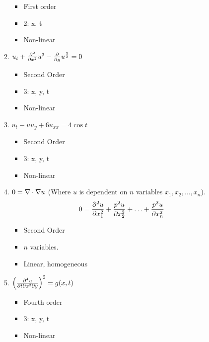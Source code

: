 \documentclass{article}
\begin{document}
\begin{enumerate}
\begin{enumerate}
    \begin{itemize}
      \item First order
      \item 2: x, t
      \item Non-linear
    \end{itemize}
    \item $u_t + \frac{\partial^2}{\partial x^2}u^3 - \frac{\partial}{\partial y}u^{\frac{5}{2}} = 0$
    \begin{itemize}
      \item Second Order
      \item 3: x, y, t
      \item Non-linear
    \end{itemize}
    \item $u_t - u u_y + 6 u_{xx} = 4 \cos t$
    \begin{itemize}
      \item Second Order
      \item 3: x, y, t
      \item Non-linear
    \end{itemize}
    \item $0 = \nabla \cdot \nabla u$ (Where $u$ is dependent on $n$ variables $x_1, x_2, \ldots, x_n$).
    \begin{align*}
      0 & = \frac{\partial^2 u}{\partial x^2_1} + \frac{p^2 u}{\partial x^2_2} + \ldots + \frac{p^2 u}{\partial x^2_n}
    \end{align*}
    \begin{itemize}
      \item Second Order
      \item $n$ variables.
      \item Linear, homogeneous
    \end{itemize}
    \item $\Big( \frac{\partial^4 u}{\partial t \partial x^2 \partial y} \Big)^2 = g(x, t)$
    \begin{itemize}
      \item Fourth order
      \item 3: x, y, t
      \item Non-linear
    \end{itemize}

\end{enumerate}
\end{enumerate}
\end{document}
